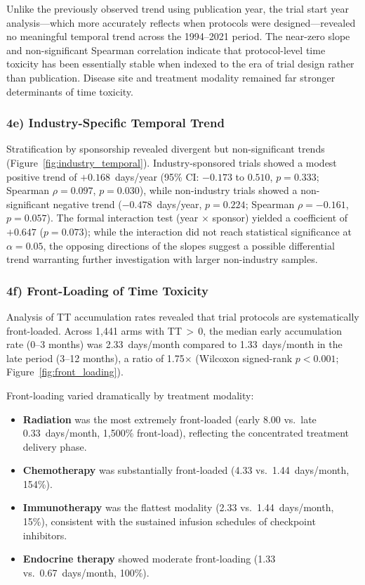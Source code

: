 \documentclass[11pt,a4paper]{article}
\begin{document}
Unlike the previously observed trend using publication year, the trial start year analysis---which more accurately reflects when protocols were designed---revealed no meaningful temporal trend across the 1994--2021 period. The near-zero slope and non-significant Spearman correlation indicate that protocol-level time toxicity has been essentially stable when indexed to the era of trial design rather than publication. Disease site and treatment modality remained far stronger determinants of time toxicity.

\subsubsection{4e) Industry-Specific Temporal Trend}

Stratification by sponsorship revealed divergent but non-significant trends (Figure~\ref{fig:industry_temporal}). Industry-sponsored trials showed a modest positive trend of $+0.168$~days/year (95\% CI: $-0.173$ to $0.510$, $p=0.333$; Spearman $\rho=0.097$, $p=0.030$), while non-industry trials showed a non-significant negative trend ($-0.478$~days/year, $p=0.224$; Spearman $\rho=-0.161$, $p=0.057$). The formal interaction test (year $\times$ sponsor) yielded a coefficient of $+0.647$ ($p=0.073$); while the interaction did not reach statistical significance at $\alpha=0.05$, the opposing directions of the slopes suggest a possible differential trend warranting further investigation with larger non-industry samples.

\subsubsection{4f) Front-Loading of Time Toxicity}

Analysis of TT accumulation rates revealed that trial protocols are systematically front-loaded. Across 1{,}441 arms with TT\,$>$\,0, the median early accumulation rate (0--3 months) was 2.33~days/month compared to 1.33~days/month in the late period (3--12 months), a ratio of 1.75$\times$ (Wilcoxon signed-rank $p<0.001$; Figure~\ref{fig:front_loading}).

Front-loading varied dramatically by treatment modality:
\begin{itemize}
    \item \textbf{Radiation} was the most extremely front-loaded (early 8.00 vs.\ late 0.33~days/month, 1{,}500\% front-load), reflecting the concentrated treatment delivery phase.
    \item \textbf{Chemotherapy} was substantially front-loaded (4.33 vs.\ 1.44~days/month, 154\%).
    \item \textbf{Immunotherapy} was the flattest modality (2.33 vs.\ 1.44~days/month, 15\%), consistent with the sustained infusion schedules of checkpoint inhibitors.
    \item \textbf{Endocrine therapy} showed moderate front-loading (1.33 vs.\ 0.67~days/month, 100\%).
\end{itemize}
\end{document}
